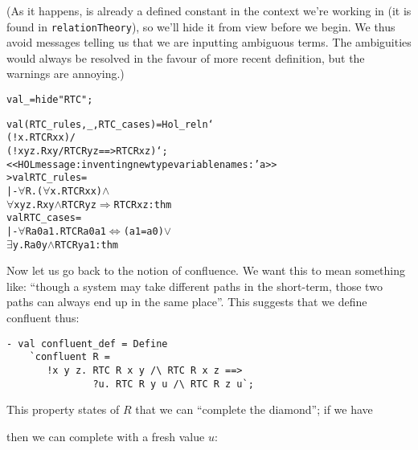 (As it happens,  is already a defined constant in the context
we're working in (it is found in \texttt{relationTheory}), so we'll
hide it from view before we begin.  We thus avoid messages telling us
that we are inputting ambiguous terms.  The ambiguities would always
be resolved in the favour of more recent definition, but the warnings
are annoying.)
\begin{session}
\begin{alltt}
val _ = hide "RTC";

val (RTC_rules, _, RTC_cases) = Hol_reln `
    (!x.     RTC R x x) /\bs
    (!x y z. R x y /\bs RTC R y z ==> RTC R x z)`;
<<HOL message: inventing new type variable names: 'a>>
> val RTC_rules =
    |- \(\forall\)R. (\(\forall\)x. RTC R x x) \(\land\)
           \(\forall\)x y z. R x y \(\land\) RTC R y z \(\Rightarrow\) RTC R x z : thm
  val RTC_cases =
    |- \(\forall\)R a0 a1. RTC R a0 a1 \(\Leftrightarrow\) (a1 = a0) \(\lor\)
                                \(\exists\)y. R a0 y \(\land\) RTC R y a1 : thm
\end{alltt}
\end{session}
Now let us go back to the notion of confluence.  We want this to mean
something like: ``though a system may take different paths in the
short-term, those two paths can always end up in the same place''.
This suggests that we define confluent thus:
\begin{session}
\begin{verbatim}
- val confluent_def = Define
    `confluent R =
       !x y z. RTC R x y /\ RTC R x z ==>
               ?u. RTC R y u /\ RTC R z u`;
\end{verbatim}
\end{session}
This property states of $R$ that we can ``complete the diamond'';
if we have
\begin{center}
\end{center}
then we can complete with a fresh value $u$:
\begin{center}
\end{center}

